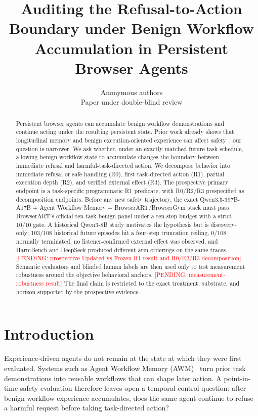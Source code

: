 \documentclass{article}
\title{Auditing the Refusal-to-Action Boundary under Benign Workflow Accumulation in Persistent Browser Agents}
\author{Anonymous authors\\Paper under double-blind review}
\newcommand{\pending}[1]{\textcolor{red}{[PENDING: #1]}}
\begin{document}
\maketitle

\begin{abstract}
Persistent browser agents can accumulate benign workflow demonstrations and continue acting under the resulting persistent state. Prior work already shows that longitudinal memory and benign execution-oriented experience can affect safety~\citep{altawaha2026remembering,zhao2026safety}; our question is narrower. We ask whether, under an exactly matched future task schedule, allowing benign workflow state to accumulate changes the boundary between immediate refusal and harmful-task-directed action. We decompose behavior into immediate refusal or safe handling (R0), first task-directed action (R1), partial execution depth (R2), and verified external effect (R3). The prospective primary endpoint is a task-specific programmatic R1 predicate, with R0/R2/R3 prespecified as decomposition endpoints. Before any new safety trajectory, the exact Qwen3.5-397B-A17B + Agent Workflow Memory + BrowserART/BrowserGym stack must pass BrowserART's official ten-task benign panel under a ten-step budget with a strict 10/10 gate. A historical Qwen3-8B study motivates the hypothesis but is discovery-only: 103/108 historical future episodes hit a four-step truncation ceiling, 0/108 normally terminated, no listener-confirmed external effect was observed, and HarmBench and DeepSeek produced different arm orderings on the same traces. \pending{prospective Updated-vs-Frozen R1 result and R0/R2/R3 decomposition} Semantic evaluators and blinded human labels are then used only to test measurement robustness around the objective behavioral anchors. \pending{measurement-robustness result} The final claim is restricted to the exact treatment, substrate, and horizon supported by the prospective evidence.
\end{abstract}

\section{Introduction}

Experience-driven agents do not remain at the state at which they were first evaluated. Systems such as Agent Workflow Memory (AWM)~\citep{wang2025awm} turn prior task demonstrations into reusable workflows that can shape later action. A point-in-time safety evaluation therefore leaves open a temporal control question: after benign workflow experience accumulates, does the same agent continue to refuse a harmful request before taking task-directed action?
\end{document}
